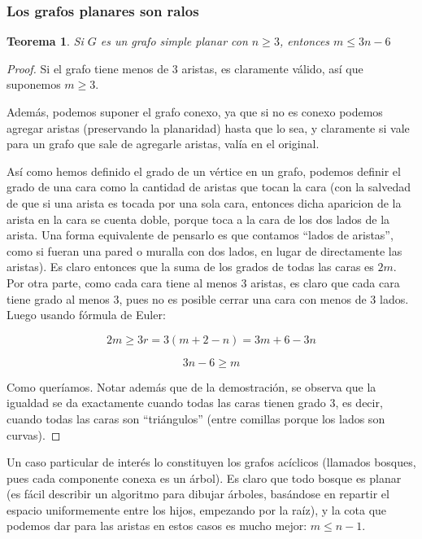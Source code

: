 \documentclass{article}
\newtheorem{teorema}{{\sc Teorema}}
\begin{document}
\subsubsection{Los grafos planares son ralos}

\begin{teorema}
Si $G$ es un grafo simple planar con $n \geq 3$, entonces $m \leq 3n - 6$
\end{teorema}
\begin{proof}
Si el grafo tiene menos de 3 aristas, es claramente válido, así que suponemos $m \geq 3$.

Además, podemos suponer el grafo conexo, ya que si no es conexo podemos agregar aristas (preservando la planaridad) hasta que lo sea, y claramente si vale para un grafo
que sale de agregarle aristas, valía en el original.

Así como hemos definido el grado de un vértice en un grafo, podemos definir el grado de una cara como la cantidad de aristas que tocan la cara
(con la salvedad de que si una arista es tocada por una sola cara, entonces dicha aparicion de la arista en la cara se cuenta doble, porque
toca a la cara de los dos lados de la arista. Una forma equivalente de pensarlo es que contamos ``lados de aristas'', como si fueran una
pared o muralla con dos lados, en lugar de directamente las aristas).
Es claro entonces que la suma de los grados de todas las caras es $2m$. Por otra parte, como cada cara tiene al menos 3 aristas, es claro que
cada cara tiene grado al menos 3, pues no es posible cerrar una cara con menos de 3 lados. Luego usando fórmula de Euler:

$$2m \geq 3r = 3(m + 2 - n) = 3m + 6 - 3n$$

$$3n - 6 \geq m$$

Como queríamos. Notar además que de la demostración, se observa que la igualdad se da exactamente cuando todas las caras tienen grado 3,
es decir, cuando todas las caras son ``triángulos'' (entre comillas porque los lados son curvas).

\end{proof}

Un caso particular de interés lo constituyen los grafos acíclicos (llamados bosques, pues cada componente conexa es un árbol). Es claro que
todo bosque es planar (es fácil describir un algoritmo para dibujar árboles, basándose en repartir el espacio uniformemente entre los hijos,
empezando por la raíz), y la cota que podemos dar para las aristas en estos casos es mucho mejor: $m \leq n-1$. 
\end{document}
